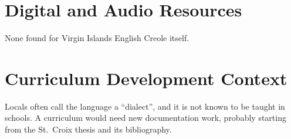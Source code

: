 \documentclass[12pt]{article}
\begin{document}
\section{Digital and Audio Resources}
None found for Virgin Islands English Creole itself.

\section{Curriculum Development Context}
Locals often call the language a ``dialect'', and it is not known to be taught in schools. A curriculum would need new documentation work, probably starting from the St.\ Croix thesis and its bibliography.
\end{document}
